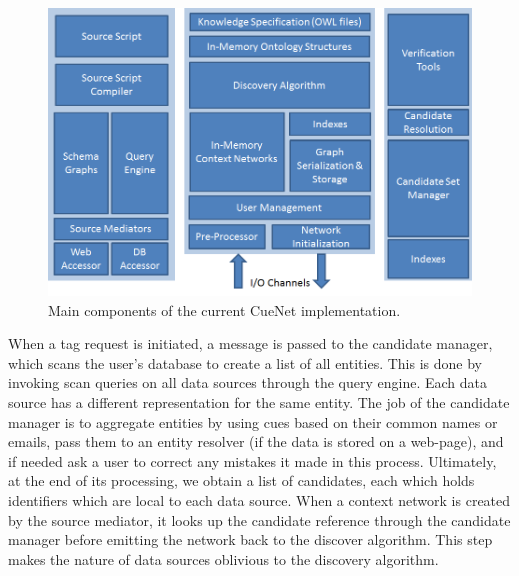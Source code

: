 \begin{figure}[t]
\centering
\includegraphics[width=\textwidth]{media/chapter4/detailed-concept-arch.png}
\caption{Main components of the current CueNet implementation.}
\label{fig:d-concept-arch}
\end{figure}

When a tag request is initiated, a message is passed to the candidate manager, which scans the user's database to create a list of all entities. This is done by invoking scan queries on all data sources through the query engine. Each data source has a different representation for the same entity. The job of the candidate manager is to aggregate entities by using cues based on their common names or emails, pass them to an entity resolver (if the data is stored on a web-page), and if needed ask a user to correct any mistakes it made in this process. Ultimately, at the end of its processing, we obtain a list of candidates, each which holds identifiers which are local to each data source. When a context network is created by the source mediator, it looks up the candidate reference through the candidate manager before emitting the network back to the discover algorithm. This step makes the nature of data sources oblivious to the discovery algorithm.

